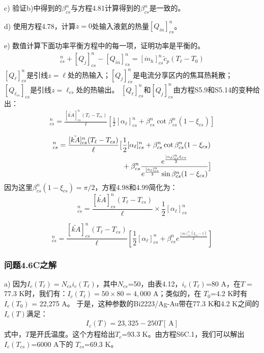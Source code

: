c) 验证b)中得到的$\beta_{cs}^n$与方程4.81计算得到的$\beta_{cs}^n$是一致的。 

d) 使用方程4.78，计算$z=0$处输入液氦的热量$[Q_{in}]^n_{cs}$。

e) 数值计算下面功率平衡方程中的每一项，证明功率是平衡的。
\begin{align}%
[Q_\ell]_{cs}^{n}+[Q_j]_{cs}^{n}-[Q_{in}]_{cs}^{n}=[\dot{m}_h]_{cs}^{n}\tilde{c}_p(T_\ell-T_0)
\end{align}
$[Q_\ell]_{cs}^{n}$是引线$z=\ell$处的热输入；$[Q_j]_{cs}^{n}$是电流分享区内的焦耳热耗散；
$[Q_{\ell_{cs}}]_{cs}$是引线$z=\ell_{cs}$处的热输出。
$[Q_\ell]_{cs}^{n}$和$[Q_j]_{cs}^{n}$由方程S5.9和S5.14的变种给出：
\begin{align}%
[Q_\ell]_{cs}^{n}=\frac{[\tilde{kA}]_{cs}^{n}(T_\ell-T_{cs})}{\ell}[\frac{1}{2}[\alpha_\ell]_{cs}^{n}+\beta_{cs}^{n}\cot\beta_{cs}^{n}(1-\xi_{cs})]
\end{align}

\begin{align*}%
[Q_j]_{cs}^{n}=\frac{[\tilde{kA}]_{cs}^{n}(T_\ell-T_{cs})}{\ell}\big[&\frac{1}{2}[\alpha_\ell]_{cs}^{n}+\beta_{cs}^{n}\cot\beta_{cs}^{n}(1-\xi_{cs}) \\\notag
&+\beta_{cs}^{n}\frac{e^{\frac{[\alpha_\ell]_{cs}^{n}\xi_{cs}}{2}}}{e^{\frac{[\alpha_\ell]_{cs}^{n}}{2}}\sin\beta_{cs}^{n}(1-\xi_{cs})}\big]
\end{align*}
因为这里$\beta_{cs}^n (1-\xi_{cs})=\pi/2$，方程4.98和4.99简化为：
\begin{equation}%
[Q_\ell]_{cs}^{n}=\frac{[\tilde{kA}]_{cs}^{n}(T_\ell-T_{cs})}{\ell}\times\frac{1}{2}[\alpha_\ell]_{cs}^{n}
\end{equation}

\begin{equation}%
[Q_j]_{cs}^{n}=\frac{[\tilde{kA}]_{cs}^{n}(T_\ell-T_{cs})}{\ell}\left[\frac{1}{2}[\alpha_\ell]_{cs}^{n}+\beta_{cs}^{n}e^{\frac{[\alpha_\ell]_{cs}^{n}(\xi_{cs}-1)}{2}}\right]
\end{equation}

\subsubsection{问题4.6C之解}
a) 因为$I_c(T_\ell)=N_{cs}i_c(T_\ell)$，其中$N_{cs}$=50，由表4.12，$i_c(T_\ell)$=80 A，在$T=$77.3 K时，我们有：$I_c(T_\ell)= 50\times 80= 4,000$ A；类似的，在
$T_0$=4.2 K时有$I_c(T_0)$ = 22,275 A。
于是，这种参数的Bi2223/Ag-Au带在77.3 K和4.2 K之间的$I_c(T)$满足：
\begin{align*}
 I_c(T)=23,325-250T[\ \mathrm{A}] \tag{S6C.1}
\end{align*}
式中，$T$是开氏温度。这个方程给出$T_c$=93.3 K。由方程S6C.1，我们可以解出$I_c(T_{cs})$=6000 A下的
$T_{cs}$=69.3 K。

